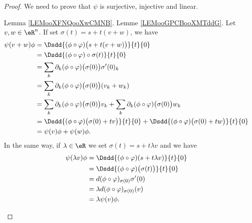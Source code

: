 \begin{proof}
	We need to prove that \( \psi\) is surjective, injective and linear.
	\begin{subproof}
		\spitem[Surjective] Lemma \ref{LEMooXFNQooXwCMNB}.
		\spitem[Injective] Lemme \ref{LEMooGPCBooXMTddG}.
		\spitem[Linear]
		Let \( v,w\in \eR^n\). If set \( \sigma(t)=s+t(v+w)\), we have
		\begin{subequations}
			\begin{align}
				\psi(v+w)\phi & =\Dsdd{ (\phi\circ \varphi)\big( s+t(v+w) \big) }{t}{0}                                                                \\
				              & =\Dsdd{ (\phi\circ \varphi)\circ \sigma(t) }{t}{0}                                                                     \\
				              & =\sum_k\partial_k(\phi\circ\varphi)\big( \sigma(0) \big)\sigma'(0)_k                                                   \\
				              & =\sum_k\partial_k(\phi\circ\varphi)\big( \sigma(0) \big)(v_k+w_k)                                                      \\
				              & =\sum_k\partial_k(\phi\circ\varphi)\big( \sigma(0) \big)v_k+\sum_k\partial_k(\phi\circ\varphi)\big( \sigma(0) \big)w_k \\
				              & =\Dsdd{ (\phi\circ\varphi)\big( \sigma(0)+tv \big) }{t}{0}+\Dsdd{ (\phi\circ\varphi)\big( \sigma(0)+tw \big) }{t}{0}   \\
				              & =\psi(v)\phi+\psi(w)\phi.
			\end{align}
		\end{subequations}
		In the same way, if \( \lambda\in \eR\) we set \( \sigma(t)=s+t\lambda v\) and we have
		\begin{subequations}
			\begin{align}
				\psi(\lambda v)\phi & =\Dsdd{ (\phi\circ\varphi)(s+t\lambda v) }{t}{0}        \\
				                    & =\Dsdd{ (\phi\circ\varphi)\big( \sigma(t) \big) }{t}{0} \\
				                    & =d(\phi\circ\varphi)_{\sigma(0)}\sigma'(0)              \\
				                    & =\lambda d(\phi\circ\varphi)_{\sigma(0)}(v)             \\
				                    & =\lambda\psi(v)\phi.
			\end{align}
		\end{subequations}
	\end{subproof}
\end{proof}

